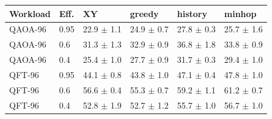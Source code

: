\begin{tabular}{llllll}
\toprule
Workload & Eff. & XY & greedy & history & minhop \\
\midrule
QAOA-96 & 0.95 & 22.9 $\pm$ 1.1 & 24.9 $\pm$ 0.7 & 27.8 $\pm$ 0.3 & 25.7 $\pm$ 1.6 \\
QAOA-96 & 0.6 & 31.3 $\pm$ 1.3 & 32.9 $\pm$ 0.9 & 36.8 $\pm$ 1.8 & 33.8 $\pm$ 0.9 \\
QAOA-96 & 0.4 & 25.4 $\pm$ 1.0 & 27.7 $\pm$ 0.9 & 31.7 $\pm$ 0.3 & 29.4 $\pm$ 1.0 \\
QFT-96 & 0.95 & 44.1 $\pm$ 0.8 & 43.8 $\pm$ 1.0 & 47.1 $\pm$ 0.4 & 47.8 $\pm$ 1.0 \\
QFT-96 & 0.6 & 56.6 $\pm$ 0.4 & 55.3 $\pm$ 0.7 & 59.2 $\pm$ 1.1 & 61.2 $\pm$ 0.7 \\
QFT-96 & 0.4 & 52.8 $\pm$ 1.9 & 52.7 $\pm$ 1.2 & 55.7 $\pm$ 1.0 & 56.7 $\pm$ 1.0 \\
\bottomrule
\end{tabular}
